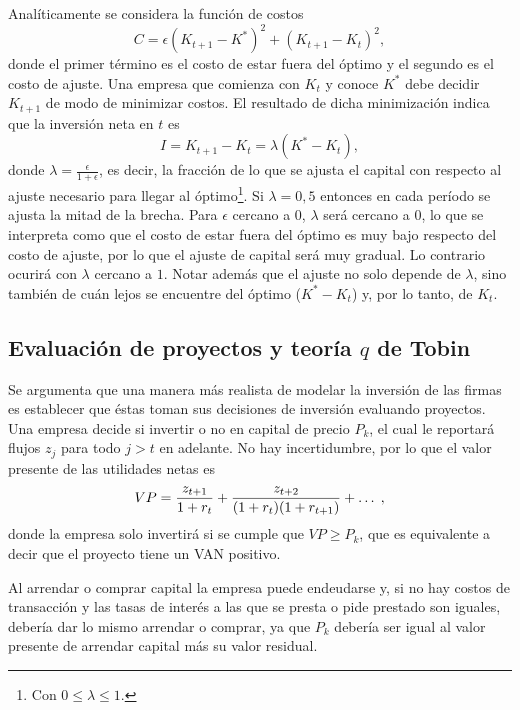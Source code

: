 \documentclass[DeGregorioResumen]{subfiles}
\begin{document}
Analíticamente se considera la función de costos
\begin{equation}
C= \epsilon ( K_{t+1}-K^*)^2+(K_{t+1}-K_t)^2,
\end{equation}
donde el primer término es el costo de estar fuera del óptimo y el segundo es el costo de ajuste. Una empresa que comienza con $K_t$ y conoce $K^*$ debe decidir $K_{t+1}$ de modo de minimizar costos. El resultado de dicha minimización indica que la inversión neta en $t$ es
\begin{equation}
I=K_{t+1}-K_t = \lambda(K^*-K_t),
\end{equation}
donde $\lambda=\frac{\epsilon}{1+\epsilon}$, es decir, la fracción de lo que se ajusta el capital con respecto al ajuste necesario para llegar al óptimo\footnote{Con $0\leq \lambda \leq 1$.}. Si $\lambda=0,5$ entonces en cada período se ajusta la mitad de la brecha. Para $\epsilon$ cercano a $0$, $\lambda$ será cercano a $0$, lo que se interpreta como que el costo de estar fuera del óptimo es muy bajo respecto del costo de ajuste, por lo que el ajuste de capital será muy gradual. Lo contrario ocurirá con $\lambda$ cercano a $1$. Notar además que el ajuste no solo depende de $\lambda$, sino también de cuán lejos se encuentre del óptimo ($K^*-K_t$) y, por lo tanto, de $K_t$.

\subsection{Evaluación de proyectos y teoría $q$ de Tobin}

Se argumenta que una manera más realista de modelar la inversión de las firmas es establecer que éstas toman sus decisiones de inversión evaluando proyectos. Una empresa decide si invertir o no en capital de precio $P_k$, el cual le reportará flujos $z_j$ para todo $j>t$ en adelante. No hay incertidumbre, por lo que el valor presente de las utilidades netas es
\begin{equation*}
VP=\frac{{z}_{t+1}}{1+r_t}+\frac{{z}_{t+2}}{(1+r_t)(1+r_{t+1})}+\ldots \;,
\end{equation*}
donde la empresa solo invertirá si se cumple que $VP \geq P_k$, que es equivalente a decir que el proyecto tiene un VAN positivo.

Al arrendar o comprar capital la empresa puede endeudarse y, si no hay costos de transacción y las tasas de interés a las que se presta o pide prestado son iguales, debería dar lo mismo arrendar o comprar, ya que $P_k$ debería ser igual al valor presente de arrendar capital más su valor residual.
\end{document}
